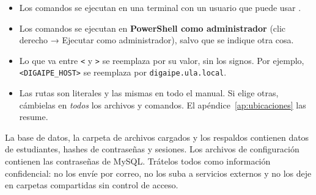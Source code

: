 \begin{itemize}
	\item {} Los comandos se ejecutan en una terminal con un usuario que puede usar
	      .
	\item {} Los comandos se ejecutan en \textbf{PowerShell como administrador}
	      (clic derecho → Ejecutar como administrador), salvo que se indique otra cosa.
	\item Lo que va entre \texttt{<} y \texttt{>} se reemplaza por su valor, sin los signos.
	      Por ejemplo, \texttt{<DIGAIPE\_HOST>} se reemplaza por \texttt{digaipe.ula.local}.
	\item Las rutas son literales y las mismas en todo el manual. Si elige otras, cámbielas en
	      \emph{todos} los archivos y comandos. El apéndice~\ref{ap:ubicaciones} las resume.
\end{itemize}

\begin{aviso}
	La base de datos, la carpeta de archivos cargados y los respaldos contienen datos de
	estudiantes, hashes de contraseñas y sesiones. Los archivos de configuración contienen las
	contraseñas de MySQL. Trátelos todos como información confidencial: no los envíe por correo,
	no los suba a servicios externos y no los deje en carpetas compartidas sin control de acceso.
\end{aviso}
